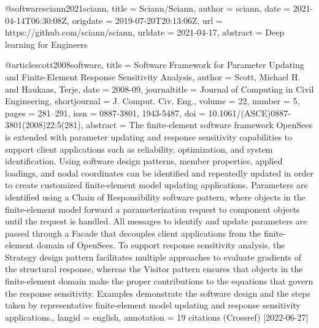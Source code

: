 @software{sciann2021sciann,
  title = {Sciann/Sciann},
  author = {{sciann}},
  date = {2021-04-14T06:30:08Z},
  origdate = {2019-07-20T20:13:06Z},
  url = {https://github.com/sciann/sciann},
  urldate = {2021-04-17},
  abstract = {Deep learning for Engineers}
}

@article{scott2008software,
  title = {Software {{Framework}} for {{Parameter Updating}} and {{Finite-Element Response Sensitivity Analysis}}},
  author = {Scott, Michael H. and Haukaas, Terje},
  date = {2008-09},
  journaltitle = {Journal of Computing in Civil Engineering},
  shortjournal = {J. Comput. Civ. Eng.},
  volume = {22},
  number = {5},
  pages = {281--291},
  issn = {0887-3801, 1943-5487},
  doi = {10.1061/(ASCE)0887-3801(2008)22:5(281)},
  abstract = {The finite-element software framework OpenSees is extended with parameter updating and response sensitivity capabilities to support client applications such as reliability, optimization, and system identification. Using software design patterns, member properties, applied loadings, and nodal coordinates can be identified and repeatedly updated in order to create customized finite-element model updating applications. Parameters are identified using a Chain of Responsibility software pattern, where objects in the finite-element model forward a parameterization request to component objects until the request is handled. All messages to identify and update parameters are passed through a Facade that decouples client applications from the finite-element domain of OpenSees. To support response sensitivity analysis, the Strategy design pattern facilitates multiple approaches to evaluate gradients of the structural response, whereas the Visitor pattern ensures that objects in the finite-element domain make the proper contributions to the equations that govern the response sensitivity. Examples demonstrate the software design and the steps taken by representative finite-element model updating and response sensitivity applications.},
  langid = {english},
  annotation = {19 citations (Crossref) [2022-06-27]}
}

